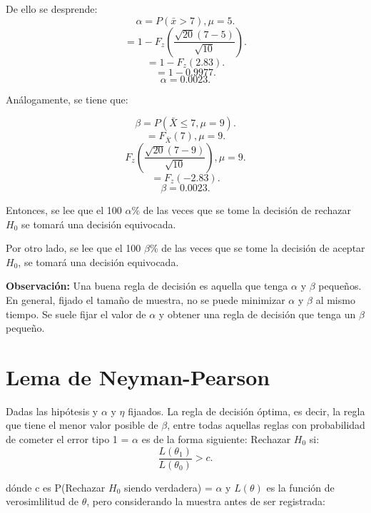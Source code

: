 \documentclass{article}
\begin{document}
De ello se desprende:
\[ \alpha=P(\bar{x}>7),\mu=5.\]
\[ =1-F_{z}{(\frac{\sqrt{20}{(7-5)}}{\sqrt{10}})}.\]
\[ =1-F_{z}{(2.83)}.\]
\[ =1-0.9977.\]
\[ \alpha=0.0023.\]

Análogamente, se tiene que:

\[ \beta = P{(\bar{X}\leq 7, \mu=9)}.\]
\[ =F_{\bar{X}}{(7)},\mu=9.\]
\[ F_{z}{(\frac{\sqrt{20}(7-9)}{\sqrt{10}})},\mu=9.\]
\[ =F_{z}{(-2.83)}.\]
\[ \beta=0.0023.\]

Entonces, se lee que el 100 $\alpha \%$ de las veces que se tome la decisión de rechazar $H_{0}$ se tomará una decisión equivocada.

Por otro lado, se lee que el 100 $\beta \%$ de las veces que se tome la decisión de aceptar $H_{0}$, se tomará una decisión equivocada.

\textbf{Observación:} Una buena regla de decisión es aquella que tenga $\alpha$ y $\beta$ pequeños. En general, fijado el tamaño de muestra, no se puede minimizar $\alpha$ y $\beta$ al mismo tiempo. Se suele fijar el valor de $\alpha$ y obtener una regla de decisión que tenga un $\beta$ pequeño.

\section{Lema de Neyman-Pearson}
Dadas las hipótesis y $\alpha$ y $\eta$ fijaados. La regla de decisión óptima, es decir, la regla que tiene el menor valor posible de $\beta$, entre todas aquellas reglas con probabilidad de cometer el error tipo 1 = $\alpha$ es de la forma siguiente: Rechazar $H_{0}$ si:
\[ \frac{L{(\theta_{1})}}{L{(\theta_{0})}} > c.\]

dónde c es P(Rechazar $H_{0}$ siendo verdadera) = $\alpha$ y $L{(\theta)}$ es la función de verosimlilitud de $\theta$, pero considerando la muestra antes de ser registrada:
\end{document}
